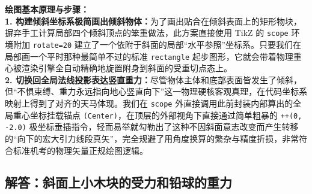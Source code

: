 {\small\color{blue!70!black}
\textbf{绘图基本原理与步骤：}\\
\textbf{1. 构建倾斜坐标系极简画出倾斜物体：}为了画出贴合在倾斜表面上的矩形物块，摒弃手工计算局部四个倾斜顶点的笨重做法，此方案直接使用 TikZ 的 \texttt{scope} 环境附加 \texttt{rotate=20} 建立了一个依附于斜面的局部“水平参照”坐标系。只要我们在局部画一个平时那种最简单不过的标准 \texttt{rectangle} 起步图形，它就会带着物理重心被渲染引擎全自动精确地旋置附身到斜面的受重切点态上。\\
\textbf{2. 切换回全局法线投影表达竖直重力：}尽管物体主体和底部表面皆发生了倾斜，但“不惧束缚、重力永远指向地心竖直向下”这一物理硬核客观真理，在代码坐标系映射上得到了对齐的天马体现。我们在 \texttt{scope} 外直接调用此前封装内部算出的全局重心坐标挂载锚点 \texttt{(Center)}，在顶层的外部视角下直接通过简单粗暴的 \texttt{++(0, -2.0)} 极坐标垂插指令，轻而易举就勾勒出了这种不因斜面意志改变而产生转移的“向下的宏大引力线段真矢”，完全规避了用角度换算的繁杂与精度折损，非常符合标准机考的物理矢量正规绘图逻辑。
}


\newpage

\subsection{解答：斜面上小木块的受力和铅球的重力}

\vspace{0.6cm}

